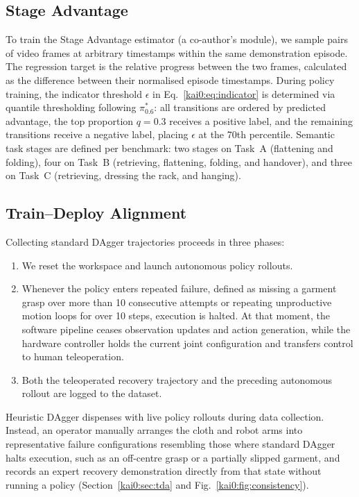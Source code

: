 \subsection{Stage Advantage}\label{kai0:app:sa}
To train the Stage Advantage estimator (a co-author's module), we sample pairs of video frames at arbitrary timestamps within the same demonstration episode. The regression target is the relative progress between the two frames, calculated as the difference between their normalised episode timestamps. During \chiz policy training, the indicator threshold $\epsilon$ in Eq.~\eqref{kai0:eq:indicator} is determined via quantile thresholding following $\pi^{*}_{0.6}$: all transitions are ordered by predicted advantage, the top proportion $q = 0.3$ receives a positive label, and the remaining transitions receive a negative label, placing $\epsilon$ at the 70th percentile. Semantic task stages are defined per benchmark: two stages on Task~A (flattening and folding), four on Task~B (retrieving, flattening, folding, and handover), and three on Task~C (retrieving, dressing the rack, and hanging).

\subsection{Train--Deploy Alignment}\label{kai0:app:tda}
Collecting standard DAgger trajectories proceeds in three phases:
\begin{enumerate}
  \item We reset the workspace and launch autonomous policy rollouts.
  \item Whenever the policy enters repeated failure, defined as missing a garment grasp over more than 10 consecutive attempts or repeating unproductive motion loops for over 10 steps, execution is halted. At that moment, the software pipeline ceases observation updates and action generation, while the hardware controller holds the current joint configuration and transfers control to human teleoperation.
  \item Both the teleoperated recovery trajectory and the preceding autonomous rollout are logged to the dataset.
\end{enumerate}
Heuristic DAgger dispenses with live policy rollouts during data collection. Instead, an operator manually arranges the cloth and robot arms into representative failure configurations resembling those where standard DAgger halts execution, such as an off-centre grasp or a partially slipped garment, and records an expert recovery demonstration directly from that state without running a policy (Section~\ref{kai0:sec:tda} and Fig.~\ref{kai0:fig:consistency}).

